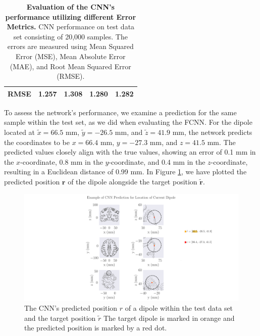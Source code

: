 \documentclass[a4paper, UKenglish, 11pt]{uiomaster}
\begin{document}
\begin{table}[!htb]
\begin{tabular}{l|cccc|}
\multicolumn{1}{|l|}{\cellcolor[HTML]{EFEFEF}RMSE} & \multicolumn{1}{c|}{1.257}                                                                                  & \multicolumn{1}{c|}{1.308}                                                                                   & \multicolumn{1}{c|}{1.280}                                                                                   & 1.282                                                                                                              \\ \hline
\end{tabular}
\caption{\textbf{Evaluation of the CNN's performance utilizing different Error Metrics.} \newline
CNN performance on test data set consisting of 20,000 samples. The errors are measured using Mean Squared Error (MSE), Mean Absolute Error (MAE), and Root Mean Squared Error (RMSE).}
\label{ch-conv-table:error_simple_dipole}
\end{table}


To assess the network's performance, we examine a prediction for the same sample within the test set, as we did when evaluating the FCNN. For the dipole located at $\tilde{x} = 66.5$ mm, $\tilde{y} = -26.5$ mm, and $\tilde{z} = 41.9$ mm, the network predicts the coordinates to be $x = 66.4$ mm, $y = -27.3$ mm, and $z = 41.5$ mm. The predicted values closely align with the true values, showing an error of 0.1 mm in the $x$-coordinate, 0.8 mm in the $y$-coordinate, and 0.4 mm in the $z$-coordinate, resulting in a Euclidean distance of 0.99 mm. In Figure \ref{fig:prediction_example}, we have plotted the predicted position $\mathbf{r}$ of the dipole alongside the target position $\mathbf{\tilde{r}}$.

\begin{figure}
  \includegraphics[width=\linewidth]{figures/CNN/single_dipole_prediction.pdf}
  \caption{The CNN's predicted position $r$ of a dipole within the test data set and the target position $\tilde{r}$ The target dipole is marked in orange and the predicted position is marked by a red dot.}
  \label{fig:prediction_example}
\end{figure}
\end{document}

